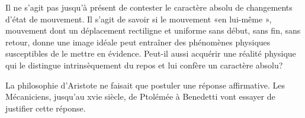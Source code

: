 Il ne s’agit pas jusqu’à présent de contester le caractère absolu de
changements d’état de mouvement. Il s’agit de savoir si le mouvement
«en lui-même », mouvement dont un déplacement rectiligne et uniforme
sans début, sans fin, sans retour, donne une image idéale peut entraîner
des phénomènes physiques susceptibles de le mettre en évidence. Peut-il
aussi acquérir une réalité physique qui le distingue intrinsèquement du
repos et lui confère un caractère absolu?

La philosophie d’Aristote ne faisait que postuler une réponse affirmative.
Les Mécaniciens, jusqu’au xvie siècle, de Ptolémée à Benedetti
vont essayer de justifier cette réponse.

